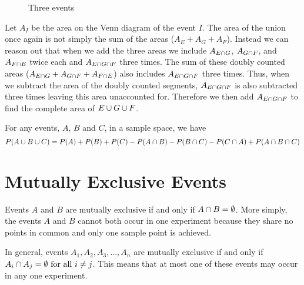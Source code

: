 \begin{figure}[ht]
\centering
{}
\caption{Three events} \label{fig:Three events}
\end{figure}
Let $A_I$ be the area on the Venn diagram of the event $I$. The area of the union once again is not simply the sum of the areas ($A_E + A_G + A_F$). Instead we can reason out that when we add the three areas we include $A_{E \cap G}$, $A_{G \cap F}$, and $A_{F \cap E}$ twice each and $A_{E \cap G \cap F}$ three times. The sum of these doubly counted areas ($A_{E \cap G} + A_{G \cap F} + A_{F \cap E}$) also includes $A_{E \cap G \cap F}$ three times. Thus, when we subtract the area of the doubly counted segments, $A_{E \cap G \cap F}$ is also subtracted three times leaving this area unaccounted for. Therefore we then add $A_{E \cap G \cap F}$ to find the complete area of $E \cup G \cup F$.
\begin{theorem}
For any events, $A$, $B$ and $C$, in a sample space, we have
\[
    P(A \cup B \cup C) = P(A) + P(B) + P(C) - P(A \cap B) - P(B \cap C) - P(C \cap A) + P(A \cap B \cap C)
\]
\end{theorem}
\section{Mutually Exclusive Events}
Events $A$ and $B$ are mutually exclusive if and only if $A \cap B = \emptyset$. More simply, the events $A$ and $B$ cannot both occur in one experiment because they share no points in common and only one sample point is achieved.
\par\smallskip
In general, events $A_1,A_2,A_3,\ldots,A_n$ are mutually exclusive if and only if $A_i \cap A_j = \emptyset \text{ for }\text{all } i \neq j$. This means that at most one of these events may occur in any one experiment.
